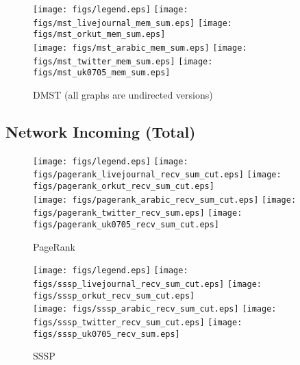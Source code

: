 \documentclass{article}
\newcommand{\bline}[1][1]{\vspace{#1\baselineskip}}
\begin{document}
\begin{figure}[!h]
  \bline[3.5]
  \centering
  \texttt{[image: figs/legend.eps]}\hspace{3em}%
  \texttt{[image: figs/mst\_livejournal\_mem\_sum.eps]}\hspace{1em}%
  \texttt{[image: figs/mst\_orkut\_mem\_sum.eps]}\\
  \texttt{[image: figs/mst\_arabic\_mem\_sum.eps]}\hspace{1em}%
  \texttt{[image: figs/mst\_twitter\_mem\_sum.eps]}\hspace{1em}%
  \texttt{[image: figs/mst\_uk0705\_mem\_sum.eps]}
  \caption{DMST (all graphs are undirected versions)}
\end{figure}

\pagebreak
\subsection{Network Incoming (Total)}
\begin{figure}[!h]
  \bline[1]
  \centering
  \texttt{[image: figs/legend.eps]}\hspace{3em}%
  \texttt{[image: figs/pagerank\_livejournal\_recv\_sum\_cut.eps]}\hspace{1em}%
  \texttt{[image: figs/pagerank\_orkut\_recv\_sum\_cut.eps]}\\
  \texttt{[image: figs/pagerank\_arabic\_recv\_sum\_cut.eps]}\hspace{1em}%
  \texttt{[image: figs/pagerank\_twitter\_recv\_sum.eps]}\hspace{1em}%
  \texttt{[image: figs/pagerank\_uk0705\_recv\_sum\_cut.eps]}
  \caption{PageRank}
\end{figure}

\begin{figure}[!h]
  \bline[3.5]
  \centering
  \texttt{[image: figs/legend.eps]}\hspace{3em}%
  \texttt{[image: figs/sssp\_livejournal\_recv\_sum\_cut.eps]}\hspace{1em}%
  \texttt{[image: figs/sssp\_orkut\_recv\_sum\_cut.eps]}\\
  \texttt{[image: figs/sssp\_arabic\_recv\_sum\_cut.eps]}\hspace{1em}%
  \texttt{[image: figs/sssp\_twitter\_recv\_sum\_cut.eps]}\hspace{1em}%
  \texttt{[image: figs/sssp\_uk0705\_recv\_sum.eps]}
  \caption{SSSP}
\end{figure}
\end{document}
